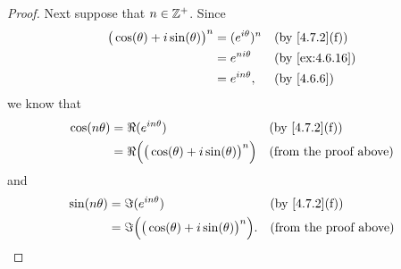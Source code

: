 \begin{proof}
  Next suppose that \(n \in \mathbb{Z}^+\).
  Since
  \begin{align*}
    \big(\cos(\theta) + i \sin(\theta)\big)^n & = (e^{i \theta})^n &  & \text{(by \cref{4.7.2}(f))} \\
                                              & = e^{n i \theta}   &  & \by{ex:4.6.16}              \\
                                              & = e^{i n \theta},  &  & \by{4.6.6}
  \end{align*}
  we know that
  \begin{align*}
    \cos(n \theta) & = \Re(e^{i n \theta})                                    &  & \text{(by \cref{4.7.2}(f))}   \\
                   & = \Re\Big(\big(\cos(\theta) + i \sin(\theta)\big)^n\Big) &  & \text{(from the proof above)}
  \end{align*}
  and
  \begin{align*}
    \sin(n \theta) & = \Im(e^{i n \theta})                                     &  & \text{(by \cref{4.7.2}(f))}   \\
                   & = \Im\Big(\big(\cos(\theta) + i \sin(\theta)\big)^n\Big). &  & \text{(from the proof above)}
  \end{align*}


\end{proof}
